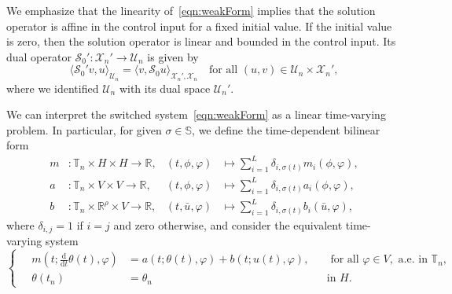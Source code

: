 \documentclass[reqno]{amsart}
\newcommand{\MK}[1]{{\color{magenta}#1\textsuperscript{MK}}}
\newcommand{\X}{{\mathscr X}}
\newcommand{\U}{{\mathscr U}}
\newcommand{\R}{\mathbb R}
\newcommand{\timeInt}{\mathbb{T}}
\newcommand{\state}{\theta}
\newcommand{\inpVar}{u}
\newcommand{\inpVarDim}{\rho}
\newcommand{\ddt}{\tfrac{\mathrm{d}}{\mathrm{d}t}}
\newcommand{\solOper}{\calS_{0}}
\newcommand{\switch}{\sigma}
\newcommand{\nrModes}{L}
\newcommand{\addSwitching}{\mathbb{S}}
\newcommand{\calS}{\mathcal{S}}
\begin{document}
We emphasize that the linearity of~\eqref{eqn:weakForm} implies that the solution operator is affine in the control input for a fixed initial value. If the initial value is zero, then the solution operator is linear and bounded in the control input. %
Its dual operator $\solOper'\colon\X_n' \to \U_n$ is given by
%
\begin{equation}\nonumber
    \langle \solOper' v , u \rangle_{\U_n} = \langle v, \solOper u\rangle_{\X_n',\X_n} \quad \text{for all }(u,v) \in \U_n \times \X_n',
\end{equation}
%
where we identified $\U_n$ with its dual space $\U_n'$.
\begin{remark}
We can interpret the switched system~\eqref{eqn:weakForm} as a linear time-varying problem. In particular, for given $\switch\in\addSwitching$, we define the time-dependent bilinear form
\begin{align*}
	m&\colon \timeInt_n\times H \times H\to \R,& (t,\phi,\varphi) &\mapsto \sum\nolimits_{i=1}^{\nrModes} \delta_{i,\switch(t)} m_i(\phi,\varphi),\\
	a&\colon \timeInt_n\times V \times V\to \R,& (t,\phi,\varphi) &\mapsto \sum\nolimits_{i=1}^{\nrModes} \delta_{i,\switch(t)} a_i(\phi,\varphi), \\
	b&\colon \timeInt_n\times \R^{\inpVarDim} \times V\to \R,& (t,\bar{\inpVar},\varphi) &\mapsto \sum\nolimits_{i=1}^{\nrModes} \delta_{i,\switch(t)} b_i(\bar{\inpVar},\varphi),
\end{align*}
where $\delta_{i,j} = 1$ if $i=j$ and zero otherwise, and consider the equivalent time-varying system
\begin{equation}\nonumber
	\left\{\quad\begin{aligned}
		m(t;\ddt \state(t),\varphi) &= a(t;\state(t),\varphi) + b(t;\inpVar(t),\varphi), && \text{ for all }\varphi\in V, \text{ a.e. in }\timeInt_n, \\
		\state(t_n) &= \state_n && \text{in }H.
	\end{aligned}\right.
\end{equation}
\end{remark}
%
\end{document}

